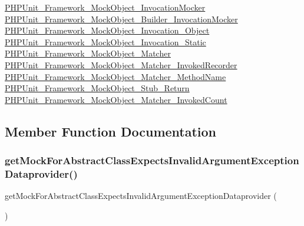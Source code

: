 \mbox{\hyperlink{class_p_h_p_unit___framework___mock_object___invocation_mocker}{P\+H\+P\+Unit\+\_\+\+Framework\+\_\+\+Mock\+Object\+\_\+\+Invocation\+Mocker}}  \mbox{\hyperlink{class_p_h_p_unit___framework___mock_object___builder___invocation_mocker}{P\+H\+P\+Unit\+\_\+\+Framework\+\_\+\+Mock\+Object\+\_\+\+Builder\+\_\+\+Invocation\+Mocker}}  \mbox{\hyperlink{class_p_h_p_unit___framework___mock_object___invocation___object}{P\+H\+P\+Unit\+\_\+\+Framework\+\_\+\+Mock\+Object\+\_\+\+Invocation\+\_\+\+Object}}  \mbox{\hyperlink{class_p_h_p_unit___framework___mock_object___invocation___static}{P\+H\+P\+Unit\+\_\+\+Framework\+\_\+\+Mock\+Object\+\_\+\+Invocation\+\_\+\+Static}}  \mbox{\hyperlink{class_p_h_p_unit___framework___mock_object___matcher}{P\+H\+P\+Unit\+\_\+\+Framework\+\_\+\+Mock\+Object\+\_\+\+Matcher}}  \mbox{\hyperlink{class_p_h_p_unit___framework___mock_object___matcher___invoked_recorder}{P\+H\+P\+Unit\+\_\+\+Framework\+\_\+\+Mock\+Object\+\_\+\+Matcher\+\_\+\+Invoked\+Recorder}}  \mbox{\hyperlink{class_p_h_p_unit___framework___mock_object___matcher___method_name}{P\+H\+P\+Unit\+\_\+\+Framework\+\_\+\+Mock\+Object\+\_\+\+Matcher\+\_\+\+Method\+Name}}  \mbox{\hyperlink{class_p_h_p_unit___framework___mock_object___stub___return}{P\+H\+P\+Unit\+\_\+\+Framework\+\_\+\+Mock\+Object\+\_\+\+Stub\+\_\+\+Return}}  \mbox{\hyperlink{class_p_h_p_unit___framework___mock_object___matcher___invoked_count}{P\+H\+P\+Unit\+\_\+\+Framework\+\_\+\+Mock\+Object\+\_\+\+Matcher\+\_\+\+Invoked\+Count}} 

\subsection{Member Function Documentation}
\mbox{\label{class_framework___mock_object___generator_test_a2c6bd28e552faf352ce04bc7e11c4ac4}} 
\subsubsection{\texorpdfstring{get\+Mock\+For\+Abstract\+Class\+Expects\+Invalid\+Argument\+Exception\+Dataprovider()}{getMockForAbstractClassExpectsInvalidArgumentExceptionDataprovider()}}
{\footnotesize\ttfamily get\+Mock\+For\+Abstract\+Class\+Expects\+Invalid\+Argument\+Exception\+Dataprovider (\begin{DoxyParamCaption}{ }\end{DoxyParamCaption})}

